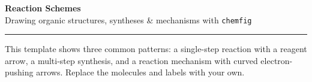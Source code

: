 \documentclass[11pt,a4paper]{article}
\begin{document}
{\color{accent}\Huge\bfseries Reaction Schemes}\\[3pt]
{\color{muted}\large Drawing organic structures, syntheses \& mechanisms with \texttt{chemfig}}\\[6pt]
{\color{accent}\rule{\linewidth}{1.2pt}}
\vspace{4pt}

This template shows three common patterns: a single-step reaction with a reagent
arrow, a multi-step synthesis, and a reaction mechanism with curved electron-pushing
arrows. Replace the molecules and labels with your own.





\end{document}
